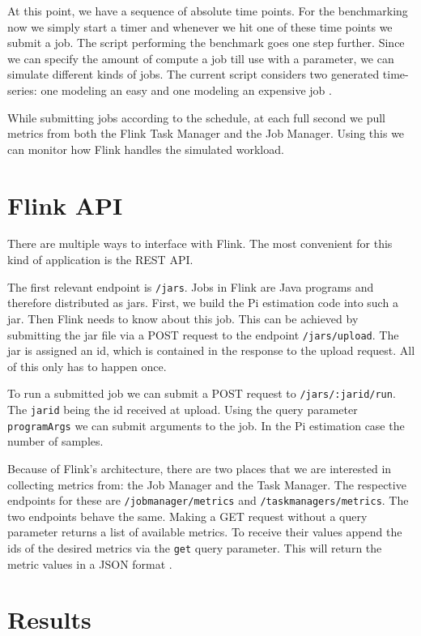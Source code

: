 At this point, we have a sequence of absolute time points. For the benchmarking now we simply start a timer and whenever we hit one of these time points we submit a job. The script performing the benchmark goes one step further. Since we can specify the amount of compute a job till use with a parameter, we can simulate different kinds of jobs. The current script considers two generated time-series: one modeling an easy and one modeling an expensive job \parencite{flinktest}.

While submitting jobs according to the schedule, at each full second we pull metrics from both the Flink Task Manager and the Job Manager. Using this we can monitor how Flink handles the simulated workload.

\section{Flink API}

There are multiple ways to interface with Flink. The most convenient for this kind of application is the REST API. 

The first relevant endpoint is \texttt{/jars}. Jobs in Flink are Java programs and therefore distributed as jars. First, we build the Pi estimation code into such a jar. Then Flink needs to know about this job. This can be achieved by submitting the jar file via a POST request to the endpoint \texttt{/jars/upload}. The jar is assigned an id, which is contained in the response to the upload request. All of this only has to happen once. 

To run a submitted job we can submit a POST request to \texttt{/jars/:jarid/run}. The \texttt{jarid} being the id received at upload. Using the query parameter \texttt{programArgs} we can submit arguments to the job. In the Pi estimation case the number of samples. 

Because of Flink's architecture, there are two places that we are interested in collecting metrics from: the Job Manager and the Task Manager. The respective endpoints for these are \texttt{/jobmanager/metrics} and \texttt{/taskmanagers/metrics}. The two endpoints behave the same. Making a GET request without a query parameter returns a list of available metrics. To receive their values append the ids of the desired metrics via the \texttt{get} query parameter. This will return the metric values in a JSON format \parencite{flinkrest}.

\section{Results}

